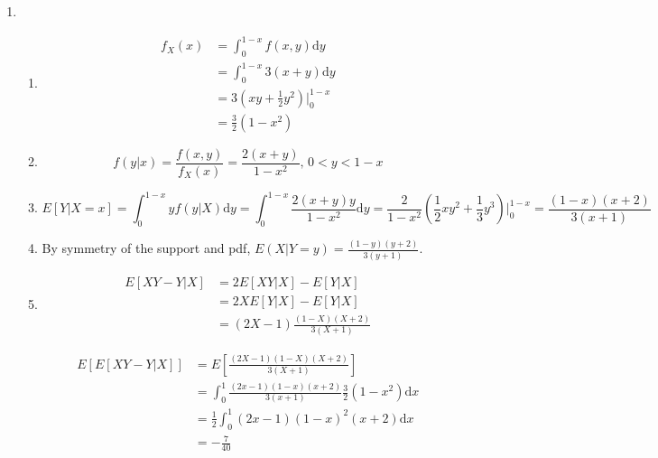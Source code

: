 \documentclass{article}
\begin{document}
\begin{enumerate}[leftmargin = 0 em, label = \arabic*., font = \bfseries]
\begin{enumerate}
		
		
	\end{enumerate}
	
	\item 
	\begin{enumerate}
		\item \begin{align*}
		f_X (x) & = \int_{0}^{1- x} f(x,y) \mathrm{d}y\\
		& = \int_{0}^{1 - x} 3(x + y) \mathrm{d}y\\
		& = 3(x y + \frac{1}{2} y^2)\bigg|_{0}^{1 - x}\\
		& = \frac{3}{2} (1 -x^2)
		\end{align*}
		
		\item 
		\[f(y | x) = \frac{f(x,y)}{f_X (x)} = \frac{2(x + y)}{1 - x^2},\, 0 < y < 1-x\]

		\item 
		\[E[Y | X = x] = \int_{0}^{1- x} y f(y|X)\mathrm{d}y = \int_{0}^{1- x} \frac{2 (x+ y)y}{1 - x^2} \mathrm{d}y = \frac{2}{1 - x^2} (\frac{1}{2} xy^2 + \frac{1}{3} y^3)\bigg|_{0}^{1-x} = \frac{(1 - x)(x + 2)}{3(x+1)}\]

		\item 
		By symmetry of the support and pdf, $E(X|Y = y) = \frac{(1 - y)(y + 2)}{3(y+1)}$.

		\item 
		\begin{align*}
		E[XY - Y | X] & = 2 E[XY | X] - E[Y | X]\\
		& = 2 X E[Y|X] - E[Y|X]\\
		& = (2 X - 1) \frac{(1 - X)(X + 2)}{3(X + 1)} 
		\end{align*}

		\begin{align*}
		E[E[XY - Y | X]] & = E[\frac{(2 X -1)(1 - X)(X + 2)}{3(X + 1)}]\\
		& = \int_{0}^1 \frac{(2 x -1)(1 - x)(x + 2)}{3(x + 1)} \frac{3}{2} (1 - x^2) \mathrm{d}x\\
		& = \frac{1}{2} \int_{0}^1 (2 x -1)(1 - x)^2 (x + 2) \mathrm{d}x\\
		& = - \frac{7}{40}
		\end{align*}
		
		
	\end{enumerate}


\end{enumerate}
\end{document}

